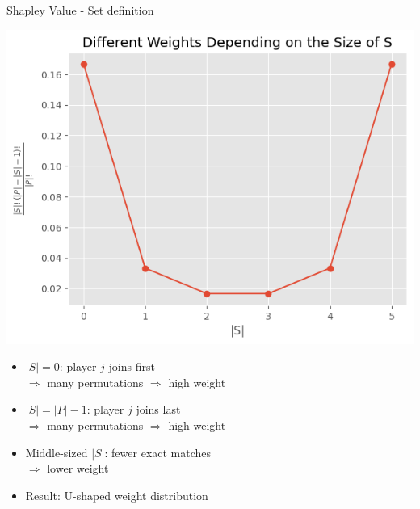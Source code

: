\documentclass[11pt,compress,t,notes=noshow, aspectratio=169, xcolor=table]{beamer}
\begin{document}
\begin{frame}{Shapley Value - Set definition}
\pause
    \begin{minipage}[c]{0.44\textwidth}
        \includegraphics[width=\textwidth]{figure_man/multinom_coef_over_size.png}
    \end{minipage}
    \begin{minipage}[c]{0.55\textwidth}
\begin{itemize}
  \item \( |S| = 0 \): player \( j \) joins first\\ \( \Rightarrow \) many permutations \( \Rightarrow \) high weight
  \item \( |S| = |P| - 1 \): player \( j \) joins last\\
  \( \Rightarrow \) many permutations \( \Rightarrow \) high weight
  \item Middle-sized \( |S| \): fewer exact matches \\
  \( \Rightarrow \) lower weight
  \item Result: U-shaped weight distribution %
\end{itemize}
    \end{minipage}
\end{frame}
\end{document}
